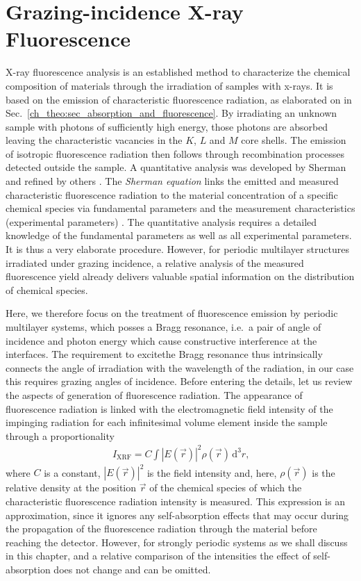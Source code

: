 \section{Grazing-incidence X-ray Fluorescence}
X-ray fluorescence analysis is an established method to characterize the chemical composition of materials through the irradiation of samples with x-rays. It is based on the emission of characteristic fluorescence radiation, as elaborated on in Sec.~\ref{ch_theo:sec_absorption_and_fluorescence}. By irradiating an unknown sample with photons of sufficiently high energy, those photons are absorbed leaving the characteristic vacancies in the $K$, $L$ and $M$ core shells. The emission of isotropic fluorescence radiation then follows through recombination processes detected outside the sample. A quantitative analysis was developed by Sherman \cite{sherman_theoretical_1955} and refined by others \cite{shiraiwa_theoretical_1966, criss_calculation_1968, rasberry_calibration_1974}. The \emph{Sherman equation} links the emitted and measured characteristic fluorescence radiation to the material concentration of a specific chemical species via fundamental parameters and the measurement characteristics (experimental parameters) \cite{rousseau_fundamental_1984}. The quantitative analysis requires a detailed knowledge of the fundamental parameters as well as all experimental parameters. It is thus a very elaborate procedure. However, for periodic multilayer structures irradiated under grazing incidence, a relative analysis of the measured fluorescence yield already delivers valuable spatial information on the distribution of chemical species.

Here, we therefore focus on the treatment of fluorescence emission by periodic multilayer systems, which posses a Bragg resonance, i.e.~a pair of angle of incidence and photon energy which cause constructive interference at the interfaces. The requirement to excitethe Bragg resonance thus intrinsically connects the angle of irradiation with the wavelength of the radiation, in our case this requires grazing angles of incidence. Before entering the details, let us review the aspects of generation of fluorescence radiation. The appearance of fluorescence radiation is linked with the electromagnetic field intensity of the impinging radiation for each infinitesimal volume element inside the sample through a proportionality
\begin{align}
 I_\text{XRF} = C \int |E(\vec{r})|^2 \rho(\vec{r}) 
\,\text{d}^3 r \text{,} \label{ch_theo:eqn_general_I_GIXRF}
\end{align}
where $C$ is a constant, $|E(\vec{r})|^2$ is the field intensity and, here, $\rho(\vec{r})$ is the relative density at the position $\vec{r}$ of the chemical species of which the characteristic fluorescence radiation intensity is measured. This expression is an approximation, since it ignores any self-absorption effects that may occur during the propagation of the fluorescence radiation through the material before reaching the detector. However, for strongly periodic systems as we shall discuss in this chapter, and a relative comparison of the intensities the effect of self-absorption does not change and can be omitted.


